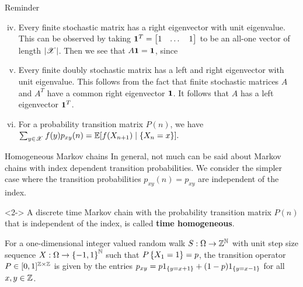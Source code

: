 \documentclass[12pt,aspectratio=169]{beamer}
\begin{document}
\begin{frame}
\begin{block}{Reminder}
\begin{enumerate}[(i)]
\setcounter{enumi}{3}
\item<1-> Every finite stochastic matrix has a right eigenvector with unit eigenvalue. 
This can be observed by taking $\mathbf{1}^T = \begin{bmatrix}1 & \dots & 1\end{bmatrix}$ to be an all-one vector of length $\left\lvert\mathscr{X}\right\rvert$. 
Then we see that $A \mathbf{1} = \mathbf{1}$, since 
\item<2-> Every finite doubly stochastic matrix has a left and right eigenvector with unit eigenvalue. 
This follows from the fact that finite stochastic matrices $A$ and $A^T$ have a common right eigenvector $\mathbf{1}$. 
It follows that $A$ has a left eigenvector $\mathbf{1}^T$. 
\item<3-> For a probability transition matrix $P(n)$, we have 
$
\sum_{y \in \mathscr{X}}f(y)p_{xy}(n) = \mathbb{E}[f(X_{n+1})\mid\left\{X_n =x\right\}].  
$ 
\end{enumerate}
\end{block}
\end{frame}

\begin{frame}{Homogeneous Markov chains}
In general, not much can be said about Markov chains with index dependent transition probabilities. 
We consider the simpler case where the transition probabilities $p_{xy}(n)= p_{xy}$ are independent of the index. 
\begin{Definition}<2->
A discrete time Markov chain with the probability transition matrix $P(n)$ that is independent of the index, 
is called \textbf{time homogeneous}. %
\end{Definition}
\end{frame}


\begin{frame}
\begin{Example} 
\label{exmp:IRW}
For a one-dimensional integer valued random walk $S: \Omega \to \mathbb{Z}^{\mathbb{N}}$ with \iid unit step size sequence $X: \Omega \to \left\{-1,1\right\}^{\mathbb{N}}$ such that $P\left\{X_1 = 1\right\} = p$, 
the transition operator $P \in [0,1]^{\mathbb{Z}\times\mathbb{Z}}$ is given by the entries 
$
p_{xy} = p1_{\left\{y=x+1\right\}}+(1-p)1_{\left\{y=x-1\right\}} 
$
for all $x,y \in\mathbb{Z}$. 
\end{Example}
\end{frame}
\end{document}
